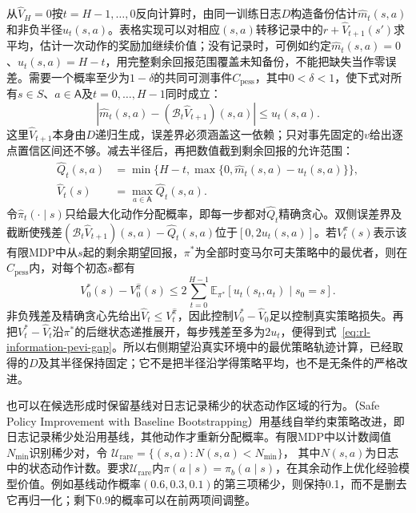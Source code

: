 从$\widehat V_H=0$按$t=H-1,\ldots,0$反向计算时，由同一训练日志$D$构造备份估计$\widehat m_t(s,a)$和非负半径$u_t(s,a)$。表格实现可以对相应$(s,a)$转移记录中的$r+\widehat V_{t+1}(s')$求平均，估计一次动作的奖励加继续价值；没有记录时，可例如约定$\widehat m_t(s,a)=0$、$u_t(s,a)=H-t$，用完整剩余回报范围覆盖未知备份，不能把缺失当作零误差。需要一个概率至少为$1-\delta$的共同可测事件$C_{\mathrm{pess}}$，其中$0<\delta<1$，使下式对所有$s\in S$、$a\in\mathsf A$及$t=0,\ldots,H-1$同时成立：
\begin{equation}
  \left|\widehat m_t(s,a)
       -(\mathcal B_t\widehat V_{t+1})(s,a)\right|
       \leq u_t(s,a).
  \label{eq:rl-information-pevi-confidence}
\end{equation}
这里$\widehat V_{t+1}$本身由$D$递归生成，误差界必须涵盖这一依赖；只对事先固定的$v$给出逐点置信区间还不够。减去半径后，再把数值截到剩余回报的允许范围：
\begin{equation}
  \begin{aligned}
    \widehat Q_t(s,a)
      &=\min\{H-t,\max\{0,\widehat m_t(s,a)-u_t(s,a)\}\},\\
    \widehat V_t(s)&=\max_{a\in\mathsf A}\widehat Q_t(s,a).
  \end{aligned}
  \label{eq:rl-information-pevi-backup}
\end{equation}
令$\widehat\pi_t(\cdot\mid s)$只给最大化动作分配概率，即每一步都对$\widehat Q_t$精确贪心。双侧误差界及截断使残差$(\mathcal B_t\widehat V_{t+1})(s,a)-\widehat Q_t(s,a)$位于$[0,2u_t(s,a)]$。若$V_t^\pi(s)$表示该有限MDP中从$s$起的剩余期望回报，$\pi^*$为全部时变马尔可夫策略中的最优者，则在$C_{\mathrm{pess}}$内，对每个初态$s$都有
\begin{equation}
  V_0^*(s)-V_0^{\widehat\pi}(s)
     \leq2\sum_{t=0}^{H-1}
       \mathbb E_{\pi^*}\!\left[u_t(s_t,a_t)\mid s_0=s\right].
  \label{eq:rl-information-pevi-gap}
\end{equation}
非负残差及精确贪心先给出$\widehat V_t\leq V_t^{\widehat\pi}$，因此控制$V_0^*-\widehat V_0$足以控制真实策略损失。再把$V_t^*-\widehat V_t$沿$\pi^*$的后继状态递推展开，每步残差至多为$2u_t$，便得到式~\eqref{eq:rl-information-pevi-gap}。所以右侧期望沿真实环境中的最优策略轨迹计算，已经取得的$D$及其半径保持固定；它不是把半径沿学得策略平均，也不是无条件的严格改进。

也可以在候选形成时保留基线对日志记录稀少的状态动作区域的行为。（Safe Policy Improvement with Baseline Bootstrapping）用基线自举约束策略改进，即日志记录稀少处沿用基线，其他动作才重新分配概率。有限MDP中以计数阈值$N_{\min}$识别稀少对，令
$\mathcal U_{\mathrm{rare}}=\{(s,a):N(s,a)<N_{\min}\}$，
其中$N(s,a)$为日志中的状态动作计数。要求$\mathcal U_{\mathrm{rare}}$内$\pi(a\mid s)=\pi_b(a\mid s)$，在其余动作上优化经验模型价值。例如基线动作概率$(0.6,0.3,0.1)$的第三项稀少，则保持0.1，而不是删去它再归一化；剩下0.9的概率可以在前两项间调整。

